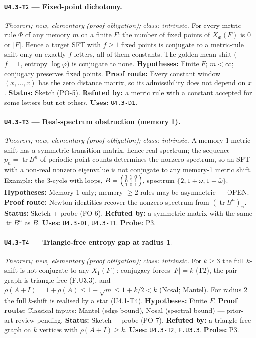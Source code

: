 \documentclass[11pt]{article}
\begin{document}
\paragraph{\texttt{U4.3-T2} --- Fixed-point dichotomy.} \emph{Theorem; new, elementary (proof obligation); class: intrinsic.} For every metric rule $\Phi$ of any memory $m$ on a finite $F$: the number of fixed points of $X_\Phi(F)$ is $0$ or $|F|$. Hence a target SFT with $f\ge1$ fixed points is conjugate to a metric-rule shift only on exactly $f$ letters, all of them constants. The golden-mean shift ($f=1$, entropy $\log\varphi$) is conjugate to none. \textbf{Hypotheses:} Finite $F$; $m<\infty$; conjugacy preserves fixed points. \textbf{Proof route:} Every constant window $(x,\dots,x)$ has the zero distance matrix, so its admissibility does not depend on $x$. \textbf{Status:} Sketch (PO-5). \textbf{Refuted by:} a metric rule with a constant accepted for some letters but not others. \textbf{Uses:} \texttt{U4.3-D1}.

\paragraph{\texttt{U4.3-T3} --- Real-spectrum obstruction (memory 1).} \emph{Theorem; new, elementary (proof obligation); class: intrinsic.} A memory-1 metric shift has a symmetric transition matrix, hence real spectrum; the sequence $p_n=\operatorname{tr}B^n$ of periodic-point counts determines the nonzero spectrum, so an SFT with a non-real nonzero eigenvalue is not conjugate to any memory-1 metric shift. Example: the 3-cycle with loops, $B=\begin{psmallmatrix}1&1&0\\0&1&1\\1&0&1\end{psmallmatrix}$, spectrum $\{2,1+\omega,1+\bar\omega\}$. \textbf{Hypotheses:} Memory 1 only; memory $\ge2$ rules may be asymmetric --- OPEN. \textbf{Proof route:} Newton identities recover the nonzero spectrum from $(\operatorname{tr}B^n)_n$. \textbf{Status:} Sketch + probe (PO-6). \textbf{Refuted by:} a symmetric matrix with the same $\operatorname{tr}B^n$ as $B$. \textbf{Uses:} \texttt{U4.3-D1}, \texttt{U4.3-T1}. \textbf{Probe:} P3.

\paragraph{\texttt{U4.3-T4} --- Triangle-free entropy gap at radius 1.} \emph{Theorem; new, elementary (proof obligation); class: intrinsic.} For $k\ge3$ the full $k$-shift is not conjugate to any $X_1(F)$: conjugacy forces $|F|=k$ (T2), the pair graph is triangle-free (F.U3.3), and $\rho(A+I)=1+\rho(A)\le1+\sqrt{m}\le1+k/2<k$ (Nosal; Mantel). For radius 2 the full $k$-shift is realised by a star (U4.1-T4). \textbf{Hypotheses:} Finite $F$. \textbf{Proof route:} Classical inputs: Mantel (edge bound), Nosal (spectral bound) --- prior-art review pending. \textbf{Status:} Sketch + probe (PO-7). \textbf{Refuted by:} a triangle-free graph on $k$ vertices with $\rho(A+I)\ge k$. \textbf{Uses:} \texttt{U4.3-T2}, \texttt{F.U3.3}. \textbf{Probe:} P3.
\end{document}
